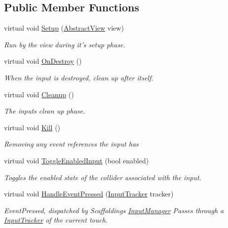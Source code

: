 \subsection*{Public Member Functions}
\begin{DoxyCompactItemize}
\item 
virtual void \hyperlink{class_scaffolding_1_1_abstract_input_a598859c6342920d2b0c985310e6e9476}{Setup} (\hyperlink{class_scaffolding_1_1_abstract_view}{Abstract\+View} view)
\begin{DoxyCompactList}\small\item\em Run by the view during it's setup phase. \end{DoxyCompactList}\item 
virtual void \hyperlink{class_scaffolding_1_1_abstract_input_a15d8f76fe4f335c622be311cfbec8b27}{On\+Destroy} ()
\begin{DoxyCompactList}\small\item\em When the input is destroyed, clean up after itself. \end{DoxyCompactList}\item 
virtual void \hyperlink{class_scaffolding_1_1_abstract_input_ab179ae99e76c6c934a0dcba4fc195e68}{Cleanup} ()
\begin{DoxyCompactList}\small\item\em The inputs clean up phase. \end{DoxyCompactList}\item 
virtual void \hyperlink{class_scaffolding_1_1_abstract_input_af1ca6d47fda48013c3521f106944d9af}{Kill} ()
\begin{DoxyCompactList}\small\item\em Removing any event references the input has \end{DoxyCompactList}\item 
virtual void \hyperlink{class_scaffolding_1_1_abstract_input_a5b19183daa9bbef63dd4637d7197c077}{Toggle\+Enabled\+Input} (bool enabled)
\begin{DoxyCompactList}\small\item\em Toggles the enabled state of the collider associated with the input. \end{DoxyCompactList}\item 
virtual void \hyperlink{class_scaffolding_1_1_abstract_input_a11e83c3462719749f8281a21024e902f}{Handle\+Event\+Pressed} (\hyperlink{class_scaffolding_1_1_input_tracker}{Input\+Tracker} tracker)
\begin{DoxyCompactList}\small\item\em Event\+Pressed, dispatched by Scaffoldings \hyperlink{class_scaffolding_1_1_input_manager}{Input\+Manager} Passes through a \hyperlink{class_scaffolding_1_1_input_tracker}{Input\+Tracker} of the current touch. \end{DoxyCompactList}\item 

\end{DoxyCompactItemize}
